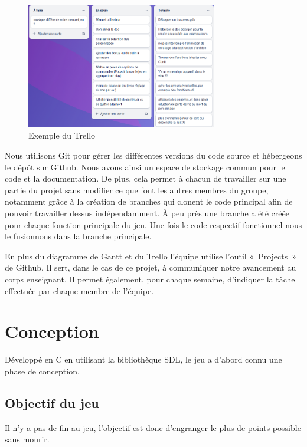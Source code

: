 \documentclass[a4paper,12pt]{article}
\begin{document}
\begin{figure}[h]
	\centering
	\includegraphics[height=5.5cm]{img/capture_trello.png}
	\caption{Exemple du Trello}
	\label{trello}
\end{figure}

Nous utilisons Git pour gérer les différentes versions du code source et hébergeons le dépôt sur Github.
Nous avons ainsi un espace de stockage commun pour le code et la documentation. De plus, cela permet à chacun de travailler sur une partie du projet sans modifier ce que font les autres membres du groupe, notamment grâce à la création de branches qui clonent le code principal afin de pouvoir travailler dessus indépendamment.
À peu près une branche a été créée pour chaque fonction principale du jeu. Une fois le code respectif fonctionnel nous le fusionnons dans la branche principale.

En plus du diagramme de Gantt et du Trello l’équipe utilise l’outil « Projects » de Github.
Il sert, dans le cas de ce projet, à communiquer notre avancement au corps enseignant. 
Il permet également, pour chaque semaine, d’indiquer la tâche effectuée par chaque membre de l’équipe.



\section{Conception}

Développé en C en utilisant la bibliothèque SDL, le jeu a d'abord connu une phase de conception.

\subsection{Objectif du jeu}
Il n’y a pas de fin au jeu, l’objectif est donc d’engranger le plus de points possible sans mourir.
\end{document}
